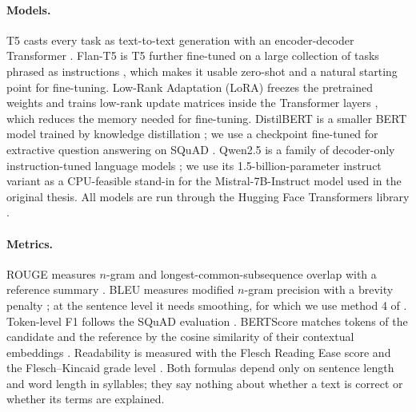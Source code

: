 \paragraph{Models.} T5 casts every task as text-to-text generation with an encoder-decoder Transformer \parencite{raffel2020t5}. Flan-T5 is T5 further fine-tuned on a large collection of tasks phrased as instructions \parencite{chung2024flan}, which makes it usable zero-shot and a natural starting point for fine-tuning. Low-Rank Adaptation (LoRA) freezes the pretrained weights and trains low-rank update matrices inside the Transformer layers \parencite{hu2022lora}, which reduces the memory needed for fine-tuning. DistilBERT is a smaller BERT model trained by knowledge distillation \parencite{sanh2019distilbert}; we use a checkpoint fine-tuned for extractive question answering on SQuAD \parencite{rajpurkar2016squad}. Qwen2.5 is a family of decoder-only instruction-tuned language models \parencite{qwen2024qwen25}; we use its 1.5-billion-parameter instruct variant as a CPU-feasible stand-in for the Mistral-7B-Instruct model \parencite{jiang2023mistral} used in the original thesis. All models are run through the Hugging Face Transformers library \parencite{wolf2020transformers}.

\paragraph{Metrics.} ROUGE measures $n$-gram and longest-common-subsequence overlap with a reference summary \parencite{lin2004rouge}. BLEU measures modified $n$-gram precision with a brevity penalty \parencite{papineni2002bleu}; at the sentence level it needs smoothing, for which we use method 4 of \textcite{chen2014smoothing}. Token-level F1 follows the SQuAD evaluation \parencite{rajpurkar2016squad}. BERTScore matches tokens of the candidate and the reference by the cosine similarity of their contextual embeddings \parencite{zhang2020bertscore}. Readability is measured with the Flesch Reading Ease score \parencite{flesch1948} and the Flesch--Kincaid grade level \parencite{kincaid1975}. Both formulas depend only on sentence length and word length in syllables; they say nothing about whether a text is correct or whether its terms are explained.
